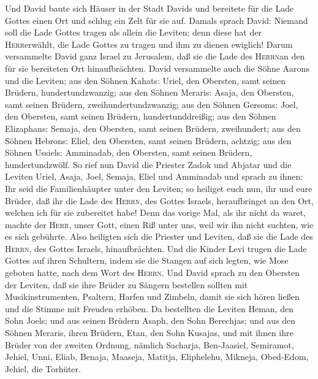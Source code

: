  Und David baute sich Häuser in der Stadt Davids und
bereitete für die Lade Gottes einen Ort und schlug ein Zelt für sie auf.
 Damals sprach David: Niemand soll die Lade Gottes tragen
als allein die Leviten; denn diese hat der \textsc{Herr}erwählt, die
Lade Gottes zu tragen und ihm zu dienen ewiglich!  Darum
versammelte David ganz Israel zu Jerusalem, daß sie die Lade des
\textsc{Herrn}an den für sie bereiteten Ort hinaufbrächten.
 David versammelte auch die Söhne Aarons und die Leviten;
 aus den Söhnen Kahats: Uriel, den Obersten, samt seinen
Brüdern, hundertundzwanzig;  aus den Söhnen Meraris:
Asaja, den Obersten, samt seinen Brüdern, zweihundertundzwanzig;
 aus den Söhnen Gersoms: Joel, den Obersten, samt seinen
Brüdern, hundertunddreißig;  aus den Söhnen Elizaphans:
Semaja, den Obersten, samt seinen Brüdern, zweihundert; 
aus den Söhnen Hebrons: Eliel, den Obersten, samt seinen Brüdern,
achtzig;  aus den Söhnen Ussiels: Amminadab, den
Obersten, samt seinen Brüdern, hundertundzwölf.  So rief
nun David die Priester Zadok und Abjatar und die Leviten Uriel, Asaja,
Joel, Semaja, Eliel und Amminadab und sprach zu ihnen: 
Ihr seid die Familienhäupter unter den Leviten; so heiliget euch nun,
ihr und eure Brüder, daß ihr die Lade des \textsc{Herrn}, des Gottes
Israels, heraufbringet an den Ort, welchen ich für sie zubereitet habe!
 Denn das vorige Mal, als ihr nicht da waret, machte der
\textsc{Herr}, unser Gott, einen Riß unter uns, weil wir ihn nicht
suchten, wie es sich gebührte.  Also heiligten sich die
Priester und Leviten, daß sie die Lade des \textsc{Herrn}, des Gottes
Israels, hinaufbrächten.  Und die Kinder Levi trugen die
Lade Gottes auf ihren Schultern, indem sie die Stangen auf sich legten,
wie Mose geboten hatte, nach dem Wort des \textsc{Herrn}.
 Und David sprach zu den Obersten der Leviten, daß sie
ihre Brüder zu Sängern bestellen sollten mit Musikinstrumenten,
Psaltern, Harfen und Zimbeln, damit sie sich hören ließen und die Stimme
mit Freuden erhöben.  Da bestellten die Leviten Heman,
den Sohn Joels; und aus seinen Brüdern Asaph, den Sohn Berechjas; und
aus den Söhnen Meraris, ihren Brüdern, Etan, den Sohn Kusajas,
 und mit ihnen ihre Brüder von der zweiten Ordnung,
nämlich Sacharja, Ben-Jaasiel, Semiramot, Jehiel, Unni, Eliab, Benaja,
Maaseja, Matitja, Eliphelehu, Mikneja, Obed-Edom, Jehiel, die Torhüter.
